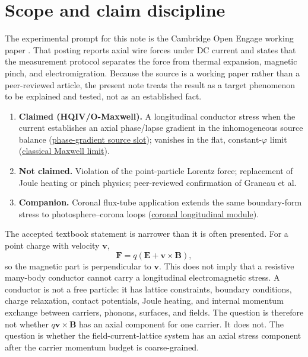 \documentclass[11pt]{amsart}
\begin{document}


\section{Scope and claim discipline}
\label{sec:scope}

The experimental prompt for this note is the Cambridge Open Engage working
paper \cite{graneau2026}. That posting reports axial wire forces under DC
current and states that the measurement protocol separates the force from
thermal expansion, magnetic pinch, and electromigration. Because the source is
a working paper rather than a peer-reviewed article, the present note treats
the result as a target phenomenon to be explained and tested, not as an
established fact.

\begin{enumerate}[leftmargin=2em]
\item \textbf{Claimed (HQIV/O-Maxwell).} A longitudinal conductor stress when
  the current establishes an axial phase/lapse gradient in the inhomogeneous
  source balance (\hyperref[lean:phase-gradient-source]{phase-gradient source
  slot}); vanishes in the flat, constant-$\varphi$ limit
  (\hyperref[lean:classical-limit]{classical Maxwell limit}).
\item \textbf{Not claimed.} Violation of the point-particle Lorentz force;
  replacement of Joule heating or pinch physics; peer-reviewed confirmation
  of Graneau et al.
\item \textbf{Companion.} Coronal flux-tube application
  \cite{hqiv-coronal-paper} extends the same boundary-form stress to
  photosphere--corona loops (\hyperref[lean:coronal-longitudinal]{coronal
  longitudinal module}).
\end{enumerate}

The accepted textbook statement is narrower than it is often presented. For a point charge with velocity $\mathbf v$,
\[
\mathbf F = q(\mathbf E+\mathbf v\times\mathbf B),
\]
so the magnetic part is perpendicular to $\mathbf v$. This does not imply that a resistive many-body conductor cannot carry a longitudinal electromagnetic stress. A conductor is not a free particle: it has lattice constraints, boundary conditions, charge relaxation, contact potentials, Joule heating, and internal momentum exchange between carriers, phonons, surfaces, and fields. The question is therefore not whether $q\mathbf v\times\mathbf B$ has an axial component for one carrier. It does not. The question is whether the field-current-lattice system has an axial stress component after the carrier momentum budget is coarse-grained.
\end{document}
